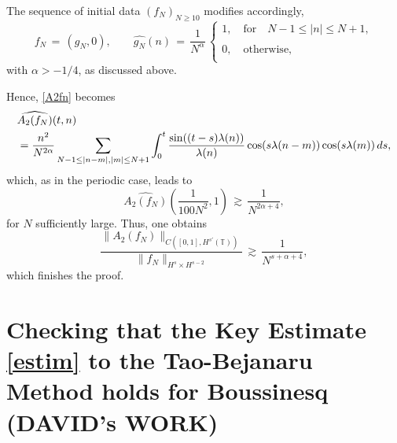 \documentclass{amsart}
\begin{document}
The sequence of initial data $(f_N)_{N\geq 10}$ modifies accordingly, 
\begin{equation}
f_N\,=\,(g_N, 0), \qquad \widehat{g_N}(n)\,=\,\frac{1}{N^\alpha}\,\left\{
\begin{array}{l}
1,\quad \text{for} \quad N-1\leq |n| \leq N+1,\\
\\
0,\quad \text{otherwise},\\
\end{array}\right.
\end{equation}
with $\alpha>-1/4$, as discussed above.

Hence, \eqref{A2fn} becomes
\begin{equation}
\aligned
&\widehat{A_2(f_N)}(t,n)\\
&=\frac{n^2}{N^{2\alpha}} \sum_{N-1\leq |n-m|, |m| \leq N+1} \int_0^t \frac{\sin((t-s) \lambda(n))}{\lambda(n)}\cos(s \lambda(n-m))\cos(s\lambda(m))\,ds,
\endaligned
\end{equation}
which, as in the periodic case, leads to 
\[
\widehat{A_2(f_N)}\left(\frac{1}{100N^2},1\right)\,\gtrsim\,\frac{1}{N^{2\alpha+4}},\]
for $N$ sufficiently large. Thus, one obtains
\begin{equation}
\frac{\|A_2(f_N)\|_{C([0,1], H^{s'}(\mathbb{T}))}}{\|f_N\|_{H^s \times H^{s -2}}}\,\gtrsim\, \frac{1}{N^{s+\alpha+4}},
\end{equation}
which finishes the proof.
%
\section{Checking that the Key Estimate \eqref{estim} to the Tao-Bejanaru Method holds for Boussinesq (DAVID's WORK)}
\end{document}
